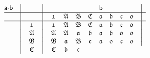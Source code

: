 \documentclass[final,12pt,a4paper,twoside,fleqn]{extbook}
\theoremstyle{definition}
\theoremstyle{remark}
\begin{document}
\begin{equation}
  \begin{array}{@{}*{22}c@{}}
      {\textsf{a\(\cdot\)b}}&%
      \big\vert     &%
      {}            &%
      \big\vert     &%
      {}            &%
      {}            &%
      {}            &%
      {}            &%
      {\textsf{b}}  &%
      {}            &%
      {}            &%
      {}            &%
      \big\vert      %
      \\ \hline \nonumber
      {}            &%
      \big\vert     &%
      {}            &%
      \big\vert     &%
      {\mathfrak{1}}&%
      {\mathfrak{A}}&%
      {\mathfrak{B}}&%
      {\mathfrak{C}}&%
      {\mathfrak{a}}&%
      {\mathfrak{b}}&%
      {\mathfrak{c}}&%
      {\mathfrak{0}}&%
      \big\vert      %
      \\ \hline \nonumber
      {}            &%
      \big\vert     &%
      {\mathfrak{1}}&%
      \big\vert     &%
      {\mathfrak{1}}&%
      {\mathfrak{A}}&%
      {\mathfrak{B}}&%
      {\mathfrak{C}}&%
      {\mathfrak{a}}&%
      {\mathfrak{b}}&%
      {\mathfrak{c}}&%
      {\mathfrak{0}}&%
      \big\vert      %
      \\ \nonumber
      {}            &%
      \big\vert     &%
      {\mathfrak{A}}&%
      \big\vert     &%
      {\mathfrak{A}}&%
      {\mathfrak{A}}&%
      {\mathfrak{a}}&%
      {\mathfrak{b}}&%
      {\mathfrak{a}}&%
      {\mathfrak{b}}&%
      {\mathfrak{0}}&%
      {\mathfrak{0}}&%
      \big\vert      %
      \\ \nonumber
      {}            &%
      \big\vert     &%
      {\mathfrak{B}}&%
      \big\vert     &%
      {\mathfrak{B}}&%
      {\mathfrak{a}}&%
      {\mathfrak{B}}&%
      {\mathfrak{c}}&%
      {\mathfrak{a}}&%
      {\mathfrak{0}}&%
      {\mathfrak{c}}&%
      {\mathfrak{0}}&%
      \big\vert      %
      \\ \nonumber
      {}             &%
      \big\vert      &%
      {\mathfrak{C}} &%
      \big\vert      &%
      {\mathfrak{C}} &%
      {\mathfrak{b}} &%
      {\mathfrak{c}} &%

\end{array}
\end{equation}
\end{document}
